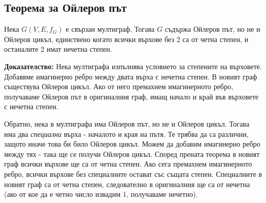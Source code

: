\documentclass[fleqn,12pt]{article}
\begin{document}
\subsection{Теорема за Ойлеров път} 
Нека $G(V,E,f_G)$ е свързан мултиграф. Тогава $G$ съдържа Ойлеров път, но не и Ойлеров цикъл, единствено когато
всички върхове без 2 са от четна степен, и останалите 2 имат нечетна степен.

\textbf{Доказателство: } Нека мултиграфа изпълнява условието за степените на върховете. Добавяме имагинерно ребро между двата върха с нечетна степен. В новият граф съществува Ойлеров цикъл.
Ако от него премахнем имагинерното ребро, получаваме Ойлеров път в оригиналния граф, имащ начало и край във върховете с нечетна степен.

Обратно, нека в мултиграфа има Ойлеров път, но не и Ойлеров цикъл. Тогава има два \textit{специални} върха - началото и края на пътя. Те трябва да 
са различни, защото иначе това би било Ойлеров цикъл. Можем да добавим имагинерно ребро между тях - така ще се получи Ойлеров цикъл. Според прената теорема 
в новият граф всички върхове ще са от четна степен. Ако сега премахнем имагинерното ребро, всички върхове без специалните остават със същата степен.
Специалните в новият граф са от четна степен, следователно в оригиналния ще са от нечетна (ако от кое да е четно число извадим 1, получаваме нечетно).
\end{document}
